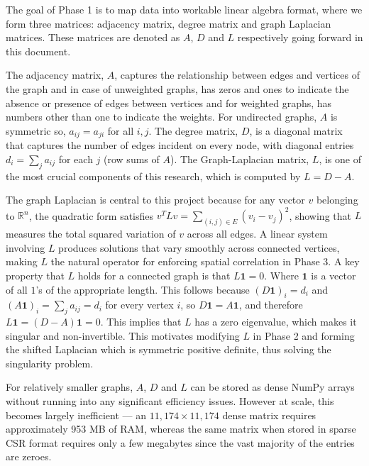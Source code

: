 \documentclass[a4paper,12pt]{amsart}
\numberwithin{equation}{section}
\begin{document}
The goal of Phase 1 is to map data into workable linear algebra format, 
where we form three matrices: adjacency matrix, degree matrix and 
graph Laplacian matrices. These matrices are denoted as $A$, $D$ and 
$L$ respectively going forward in this document.

The adjacency matrix, $A$, captures the relationship between edges and vertices 
of the graph and in case of unweighted graphs, has zeros and ones to 
indicate the absence or presence of edges between vertices and for 
weighted graphs, has numbers other than one to indicate the weights. 
For undirected graphs, $A$ is symmetric so, $a_{ij} = a_{ji}$ for all 
$i, j$. The degree matrix, $D$, is a diagonal matrix that captures the 
number of edges incident on every node, with diagonal entries 
$d_i = \sum_j a_{ij}$ for each $j$ (row sums of $A$). The 
Graph-Laplacian matrix, $L$, is one of the most crucial components of 
this research, which is computed by $L = D - A$.

The graph Laplacian is central to this project because for any vector 
$v$ belonging to $\mathbb{R}^n$, the quadratic form satisfies 
$v^T L v = \sum_{(i,j) \in E} (v_i - v_j)^2$, showing that $L$ measures the total squared variation of 
$v$ across all edges. A linear system involving $L$ produces solutions 
that vary smoothly across connected vertices, making $L$ the natural 
operator for enforcing spatial correlation in Phase 3. A key property 
that $L$ holds for a connected graph is that $L\mathbf{1} = 0$. Where $\mathbf{1}$ is a vector of all $1$'s of the appropriate length. This 
follows because $(D\mathbf{1})_i = d_i$ and 
$(A\mathbf{1})_i = \sum_j a_{ij} = d_i$ for every vertex $i$, so 
$D\mathbf{1} = A\mathbf{1}$, and therefore 
$L\mathbf{1} = (D - A)\mathbf{1} = 0$. This implies that $L$ 
has a zero eigenvalue, which makes it singular and non-invertible. 
This motivates modifying $L$ in Phase 2 and forming the shifted 
Laplacian which is symmetric positive definite, thus solving the 
singularity problem.

For relatively smaller graphs, $A$, $D$ and $L$ can be stored as dense 
NumPy arrays without running into any significant efficiency issues. 
However at scale, this becomes largely inefficient — an 
$11{,}174 \times 11{,}174$ dense matrix requires approximately 953 MB 
of RAM, whereas the same matrix when stored in sparse CSR format 
requires only a few megabytes since the vast majority of the entries 
are zeroes.
\end{document}
